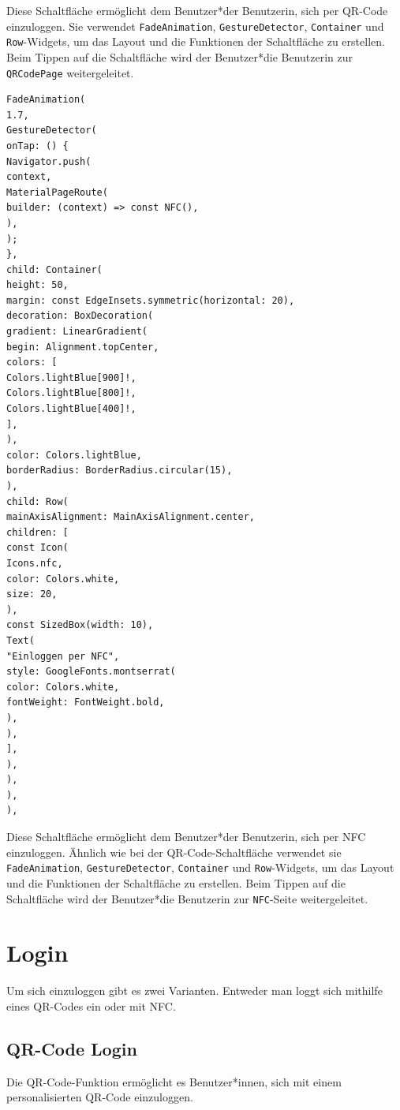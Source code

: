 Diese Schaltfläche ermöglicht dem Benutzer*der Benutzerin, sich per QR-Code einzuloggen. Sie verwendet \texttt{FadeAnimation}, \texttt{GestureDetector}, \texttt{Container} und \texttt{Row}-Widgets, um das Layout und die Funktionen der Schaltfläche zu erstellen. Beim Tippen auf die Schaltfläche wird der Benutzer*die Benutzerin zur \texttt{QRCodePage} weitergeleitet.
\pagebreak

\begin{lstlisting}[caption=NFC Schaltfläche,label=lst:impl:frontend:qrcode]
FadeAnimation(
1.7,
GestureDetector(
onTap: () {
Navigator.push(
context,
MaterialPageRoute(
builder: (context) => const NFC(),
),
);
},
child: Container(
height: 50,
margin: const EdgeInsets.symmetric(horizontal: 20),
decoration: BoxDecoration(
gradient: LinearGradient(
begin: Alignment.topCenter,
colors: [
Colors.lightBlue[900]!,
Colors.lightBlue[800]!,
Colors.lightBlue[400]!,
],
),
color: Colors.lightBlue,
borderRadius: BorderRadius.circular(15),
),
child: Row(
mainAxisAlignment: MainAxisAlignment.center,
children: [
const Icon(
Icons.nfc,
color: Colors.white,
size: 20,
),
const SizedBox(width: 10),
Text(
"Einloggen per NFC",
style: GoogleFonts.montserrat(
color: Colors.white,
fontWeight: FontWeight.bold,
),
),
],
),
),
),
),
\end{lstlisting}

Diese Schaltfläche ermöglicht dem Benutzer*der Benutzerin, sich per NFC einzuloggen. 
Ähnlich wie bei der QR-Code-Schaltfläche verwendet sie \texttt{FadeAnimation}, \texttt{GestureDetector}, \texttt{Container} und \texttt{Row}-Widgets, 
um das Layout und die Funktionen der Schaltfläche zu erstellen. Beim Tippen auf die Schaltfläche wird der Benutzer*die Benutzerin zur \texttt{NFC}-Seite weitergeleitet.
\newpage

\section{Login}
Um sich einzuloggen gibt es zwei Varianten. Entweder man loggt sich mithilfe eines QR-Codes ein oder mit NFC.

\subsection{QR-Code Login}

Die QR-Code-Funktion ermöglicht es Benutzer*innen, sich mit einem personalisierten QR-Code einzuloggen.

